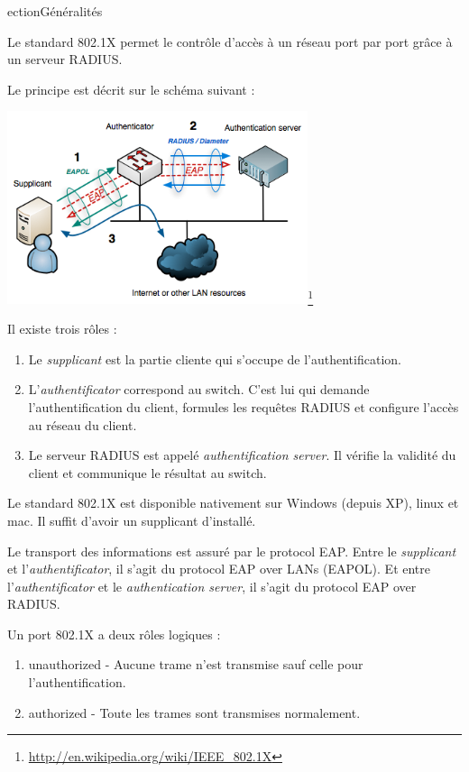 ection{Généralités}

Le standard 802.1X permet le contrôle d'accès à un réseau port par port grâce à un serveur RADIUS.

Le principe est décrit sur le schéma suivant :\\
\begin{center}
\includegraphics[width=250pt]{img/schema-dot1x.png}\footnote{\url{http://en.wikipedia.org/wiki/IEEE_802.1X}}
\end{center}

Il existe trois rôles :
\begin{enumerate}
\item Le \textit{supplicant} est la partie cliente qui s'occupe de l'authentification.
\item L'\textit{authentificator} correspond au switch. C'est lui qui demande l'authentification du client, formules les requêtes RADIUS et configure l'accès au réseau du client.
\item Le serveur RADIUS est appelé \textit{authentification server}. Il vérifie la validité du client et communique le résultat au switch.
\end{enumerate}

Le standard 802.1X est disponible nativement sur Windows (depuis XP), linux et mac. Il suffit d'avoir un supplicant d'installé.

Le transport des informations est assuré par le protocol EAP. Entre le \textit{supplicant} et l'\textit{authentificator}, il s'agit du protocol EAP over LANs (EAPOL). Et entre l'\textit{authentificator} et le \textit{authentication server}, il s'agit du protocol EAP over RADIUS.

Un port 802.1X a deux rôles logiques :
\begin{enumerate}
\item unauthorized - Aucune trame n'est transmise sauf celle pour l'authentification.
\item authorized - Toute les trames sont transmises normalement.
\end{enumerate}

